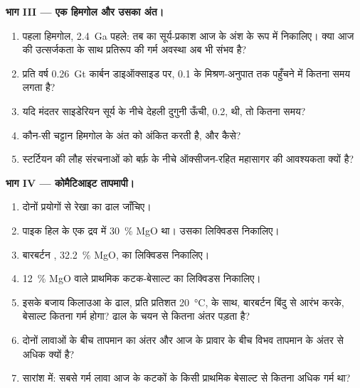 \begin{problem}[{सप्ताहांत समस्या --- एक अधिक गर्म युवा पृथ्वी}]
\noindent\textbf{भाग III --- एक हिमगोल और उसका अंत।}
\begin{enumerate}[resume]
  \item पहला हिमगोल, \qty{2.4}{Ga} पहले: तब का सूर्य-प्रकाश आज के अंश के रूप में निकालिए।
        क्या आज की उत्सर्जकता के साथ प्रतिरूप की गर्म अवस्था अब भी संभव है?
  \item प्रति वर्ष \qty{0.26}{Gt} कार्बन डाइऑक्साइड पर, 0.1 के मिश्रण-अनुपात तक पहुँचने में
        कितना समय लगता है?
  \item यदि मंदतर साइडेरियन सूर्य के नीचे देहली दुगुनी ऊँची, 0.2, थी, तो कितना समय?
  \item कौन-सी चट्टान हिमगोल के अंत को अंकित करती है, और कैसे?
  \item स्टर्टियन की लौह संरचनाओं को बर्फ़ के नीचे ऑक्सीजन-रहित महासागर की आवश्यकता क्यों है?
\end{enumerate}

\noindent\textbf{भाग IV --- कोमैटिआइट तापमापी।}
\begin{enumerate}[resume]
  \item दोनों प्रयोगों से  रेखा का ढाल जाँचिए।
  \item पाइक हिल के एक  द्रव में \qty{30}{\percent} MgO था। उसका लिक्विडस निकालिए।
  \item बारबर्टन , \qty{32.2}{\percent} MgO, का लिक्विडस निकालिए।
  \item \qty{12}{\percent} MgO वाले प्राथमिक कटक-बेसाल्ट का लिक्विडस निकालिए।
  \item इसके बजाय किलाउआ के ढाल, प्रति प्रतिशत \qty{20}{\celsius}, के साथ, बारबर्टन बिंदु से आरंभ करके,
        बेसाल्ट कितना गर्म होगा? ढाल के चयन से कितना अंतर पड़ता है?
  \item दोनों लावाओं के बीच तापमान का अंतर  और आज के प्रावार के बीच विभव तापमान के
        अंतर से अधिक क्यों है?
  \item सारांश में: सबसे गर्म   लावा आज के कटकों के किसी प्राथमिक बेसाल्ट से
        कितना अधिक गर्म था?
\end{enumerate}
\end{problem}
